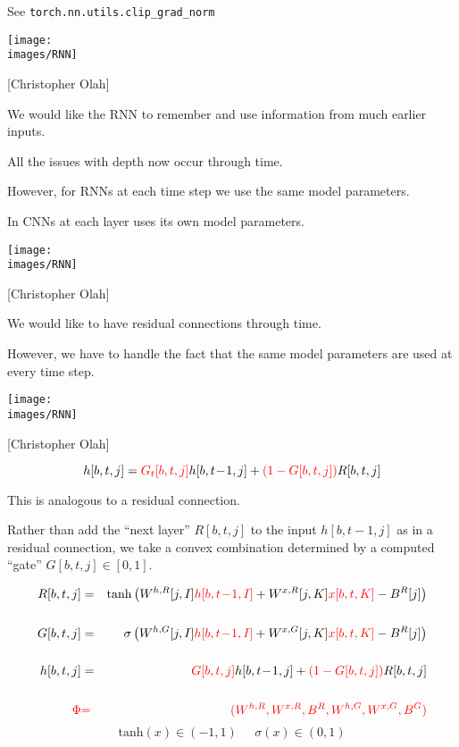 {\vfill
See {\tt torch.nn.utils.clip\_grad\_norm}


\centerline{\texttt{[image: \\images/RNN]}}
\centerline{{\large [Christopher Olah]}}

\vfill
We would like the RNN to {\color{red} remember and use} information from much earlier inputs.


\vfill
All the issues with depth now occur through time.

\vfill
However, for RNNs {\color{red} at each time step we use the same model parameters.}

\vfill
In CNNs {\color{red} at each layer uses its own model parameters.}


\centerline{\texttt{[image: \\images/RNN]}}
\centerline{{\large [Christopher Olah]}}

\vfill
We would like to have residual connections through time.

\vfill
However, we have to handle the fact that the same model parameters are used at every time step.



\centerline{\texttt{[image: \\images/RNN]}}
\centerline{{\large [Christopher Olah]}}

$$h[b,t,j] =  {\color{red} G_t[b,t,j]}h[b,t\!-\!1,j] + {\color{red} (1-G[b,t,j])}R[b,t,j]$$

\vfill
This is analogous to a residual connection.

\vfill
Rather than add the ``next layer'' $R[b,t,j]$ to the input $h[b,t\!-\!1,j]$ as in a residual connection, we take a convex combination determined by a computed ``gate'' $G[b,t,j] \in [0,1]$.


{\huge
\begin{eqnarray*}
R[b,t,j] & = & \mathrm{tanh}\left(W^{h,R}[j,I]{\color{red} h[b,t\!-\!1,I]} + W^{x,R}[j,K]{\color{red} x[b,t,K]} - B^R[j]\right) \\
\\
G[b,t,j] & = & \sigma\left(W^{h,G}[j,I]{\color{red} h[b,t\!-\!1,I]} + W^{x,G}[j,K]{\color{red} x[b,t,K]} - B^R[j]\right) \\
\\
h[b,t,j] & = & {\color{red} G[b,t,j]}h[b,t\!-\!1,j] + {\color{red} (1-G[b,t,j])}R[b,t,j] \\
\\
{\color{red} \Phi} & {\color{red} =} & {\color{red} (W^{h,R},W^{x,R},B^R,W^{h,G},W^{x,G},B^G)}
\end{eqnarray*}
}
$$\mathrm{tanh}(x) \in (-1,1)\;\;\;\;\;\sigma(x) \in (0,1)$$

}
